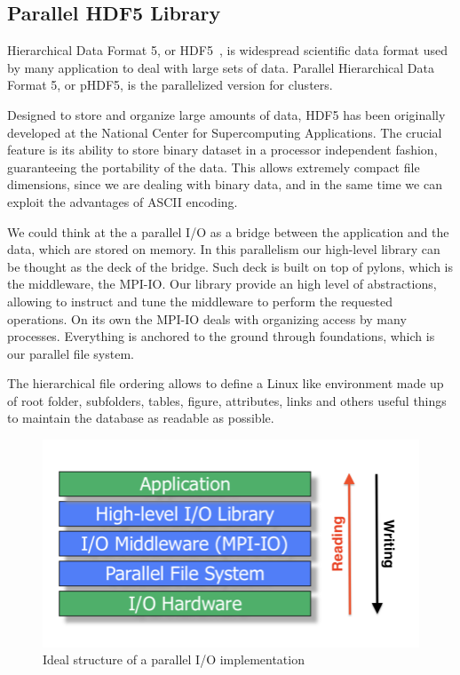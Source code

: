 \subsection{Parallel HDF5 Library}
Hierarchical Data Format 5, or HDF5~\cite{hdf5}, is widespread scientific data format used by many application to deal with large sets of data. Parallel Hierarchical Data Format 5, or pHDF5, is the parallelized version for clusters.\par
Designed to store and organize large amounts of data, HDF5 has been originally developed at the National Center for Supercomputing Applications. 
The crucial feature is its ability to store binary dataset in a processor independent fashion, guaranteeing the portability of the data. This allows extremely compact file dimensions, since we are dealing with binary data, and in the same time we can exploit the advantages of ASCII encoding.\par
We could think at the a parallel I/O as a bridge between the application and the data, which are stored on memory. In this parallelism our high-level library can be thought as the deck of the bridge. Such deck is built on top of pylons, which is the middleware, the MPI-IO. Our library provide an high level of abstractions, allowing to instruct and tune the middleware to perform the requested operations. On its own the MPI-IO deals with organizing access by many processes. Everything is anchored to the ground through foundations, which is our parallel file system.\par
The hierarchical file ordering allows to define a Linux like environment made up of root folder, subfolders, tables, figure, attributes, links and others useful things to maintain the database as readable as possible.\par
\begin{figure}
\begin{center}
\includegraphics[scale=0.4]{grafici/parallelio}
\caption{Ideal structure of a parallel I/O implementation}
\label{default}
\end{center}
\end{figure}


